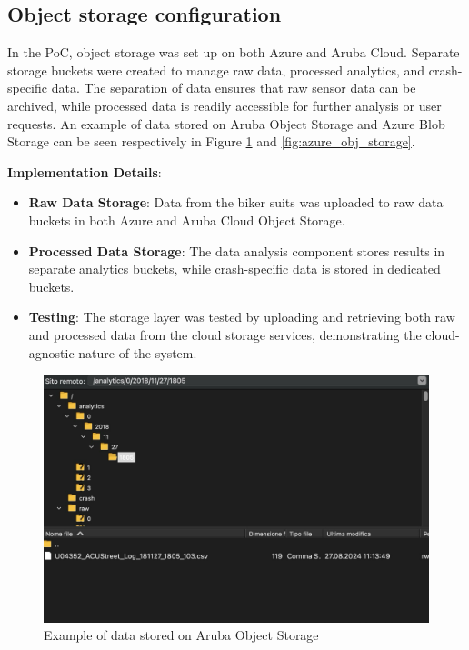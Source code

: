 \subsection{Object storage configuration}
In the PoC, object storage was set up on both Azure and Aruba Cloud. Separate storage buckets were created to manage raw data, processed analytics, and crash-specific data. The separation of data ensures that raw sensor data can be archived, while processed data is readily accessible for further analysis or user requests. An example of data stored on Aruba Object Storage and Azure Blob Storage can be seen respectively in Figure \ref{fig:aruba_obj_storage} and \ref{fig:azure_obj_storage}.

\textbf{Implementation Details}:
\begin{itemize}
    \item \textbf{Raw Data Storage}: Data from the biker suits was uploaded to raw data buckets in both Azure and Aruba Cloud Object Storage.
    \item \textbf{Processed Data Storage}: The data analysis component stores results in separate analytics buckets, while crash-specific data is stored in dedicated buckets.
    \item \textbf{Testing}: The storage layer was tested by uploading and retrieving both raw and processed data from the cloud storage services, demonstrating the cloud-agnostic nature of the system.
\end{itemize}

\begin{figure}[htbp]
    \centering
    \includegraphics[width=1\textwidth]{Immagini/data_storage.png}
    \caption{Example of data stored on Aruba Object Storage}
    \label{fig:aruba_obj_storage}
\end{figure}

